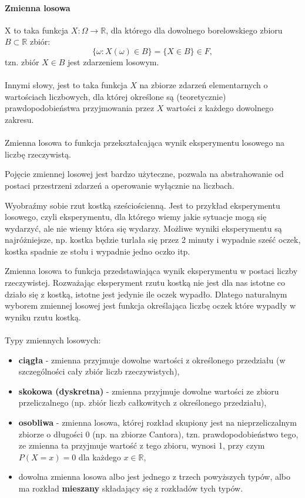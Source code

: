 \documentclass[a4paper,twoside]{report}
\begin{document}
\paragraph{Zmienna losowa} X to taka funkcja $X : \Omega \longrightarrow \mathbb{R}$, dla którego dla dowolnego borelowskiego zbioru $B \subset \mathbb{R}$ zbiór:
\begin{equation}
\{\omega : X(\omega) \in B \} = \{X \in B\} \in F,
\end{equation}
tzn. zbiór $X \in B$ jest zdarzeniem losowym.\\\\
Innymi słowy, jest to taka funkcja $X$ na zbiorze zdarzeń elementarnych o wartościach liczbowych, dla której określone są (teoretycznie) prawdopodobieństwa przyjmowania przez $X$ wartości z każdego dowolnego zakresu.\\\\

Zmienna losowa to funkcja przekształcająca wynik eksperymentu losowego na liczbę rzeczywistą. 

Pojęcie zmiennej losowej jest bardzo użyteczne, pozwala na abstrahowanie od postaci przestrzeni zdarzeń a operowanie wyłącznie na liczbach. 

Wyobraźmy sobie rzut kostką sześciościenną. Jest to przykład eksperymentu losowego, czyli eksperymentu, dla którego wiemy jakie sytuacje mogą się wydarzyć, ale nie wiemy która się wydarzy. Możliwe wyniki eksperymentu są najróżniejsze, np. kostka będzie turlała się przez 2 minuty i wypadnie sześć oczek, kostka spadnie ze stołu i wypadnie jedno oczko itp. 

Zmienna losowa to funkcja przedstawiająca wynik eksperymentu w postaci liczby rzeczywistej. Rozważając eksperyment rzutu kostką nie jest dla nas istotne co działo się z kostką, istotne jest jedynie ile oczek wypadło. Dlatego naturalnym wyborem zmiennej losowej jest funkcja określająca liczbę oczek które wypadły w wyniku rzutu kostką. \\\\
Typy zmiennych losowych:
\begin{itemize}
\item \textbf{ciągła} - zmienna przyjmuje dowolne wartości z określonego przedziału (w szczególności cały zbiór liczb rzeczywistych),
\item \textbf{skokowa (dyskretna)} - zmienna przyjmuje dowolne wartości ze zbioru przeliczalnego (np. zbiór liczb całkowitych z określonego przedziału),
\item \textbf{osobliwa} - zmienna losowa, której rozkład skupiony jest na nieprzeliczalnym zbiorze o długości 0 (np. na zbiorze Cantora), tzn. prawdopodobieństwo tego, ze zmienna ta przyjmuje wartość z tego zbioru, wynosi 1, przy czym $P(X = x) = 0$ dla każdego $x \in \mathbb{R}$,
\item dowolna zmienna losowa albo jest jednego z trzech powyższych typów, albo ma rozkład \textbf{mieszany} składający się z rozkładów tych typów.
\end{itemize}
\end{document}
